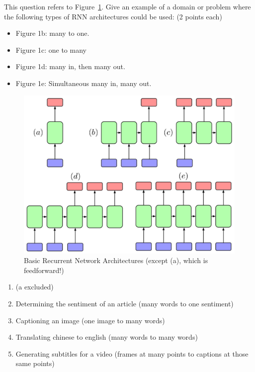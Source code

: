 This question refers to Figure~\ref{fig:basic_rnn}. Give an example of a domain or problem where the following types of RNN architectures could be used: (2 points each)
\begin{itemize}
        \item Figure 1b: many to one.
        \item Figure 1c: one to many
        \item Figure 1d: many in, then many out.
        \item  Figure 1e: Simultaneous many in, many out.
 \end{itemize}
  \begin{figure}[h]
\centering

\includegraphics[width=0.5\linewidth]{images/rnn.png}

\caption{Basic Recurrent Network Architectures (except (a), which is feedforward!)}\label{fig:basic_rnn}
\end{figure}

\begin{tcolorbox}

\begin{enumerate}[label=(\alph*)]
        \item  (a excluded)
        \item Determining the sentiment of an article (many words to one sentiment)
        \item Captioning an image (one image to many words)
        \item Translating chinese to english (many words to many words)
        \item Generating subtitles for a video (frames at many points to captions at those same points)
\end{enumerate}

\end{tcolorbox}
